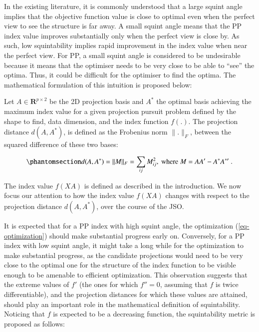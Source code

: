 \documentclass[
  number,
  preprint,
  3p]{elsarticle}
\begin{document}
In the existing literature, it is commonly understood that a large
squint angle implies that the objective function value is close to
optimal even when the perfect view to see the structure is far away. A
small squint angle means that the PP index value improves substantially
only when the perfect view is close by. As such, low squintability
implies rapid improvement in the index value when near the perfect view.
For PP, a small squint angle is considered to be undesirable because it
means that the optimiser needs to be very close to be able to ``see''
the optima. Thus, it could be difficult for the optimiser to find the
optima. The mathematical formulation of this intuition is proposed
below:

Let \(A \in \mathbf{R}^{p \times 2}\) be the 2D projection basis and
\(A^*\) the optimal basis achieving the maximum index value for a given
projection pursuit problem defined by the shape to find, data dimension,
and the index function \(f(.)\). The projection distance \(d(A, A^*)\),
is defined as the Frobenius norm \(\lVert . \rVert _F\), between the
squared difference of these two bases:

\begin{equation}\phantomsection\label{eq-proj-dist}{d(A, A^*) = \lVert M \rVert _F = \sum_{ij} M_{ij}^2, \text{ where } M = AA^\prime - A^*A^{*\prime}\ .}\end{equation}

The index value \(f(XA)\) is defined as described in the introduction.
We now focus our attention to how the index value \(f(XA)\) changes with
respect to the projection distance \(d(A, A^*)\), over the course of the
JSO.

It is expected that for a PP index with high squint angle, the
optimization (\ref{eq-optimization}) should make substantial progress
early on. Conversely, for a PP index with low squint angle, it might
take a long while for the optimization to make substantial progress, as
the candidate projections would need to be very close to the optimal one
for the structure of the index function to be visible enough to be
amenable to efficient optimization. This observation suggests that the
extreme values of \(f'\) (the ones for which \(f''=0\), assuming that
\(f\) is twice differentiable), and the projection distances for which
these values are attained, should play an important role in the
mathematical definition of squintability. Noticing that \(f\) is
expected to be a decreasing function, the squintability metric is
proposed as follows:
\end{document}
